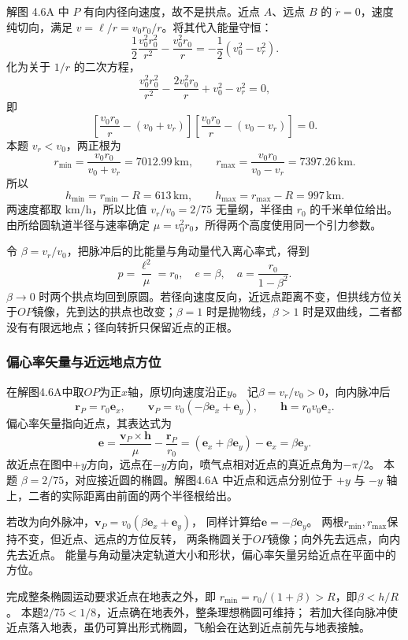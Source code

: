 \documentclass[UTF8,fontset=fandol,a4paper,11pt]{ctexart}
\newcommand{\vect}[1]{\bm{#1}}
\begin{document}
解图 4.6A 中 $P$ 有向内径向速度，故不是拱点。近点 $A$、远点 $B$ 的 $\dot r=0$，速度纯切向，满足 $v=\ell/r=v_0r_0/r$。将其代入能量守恒：
\[
\frac12\frac{v_0^2r_0^2}{r^2}-\frac{v_0^2r_0}{r}
=-\frac12(v_0^2-v_r^2).
\]
化为关于 $1/r$ 的二次方程，
\[
\frac{v_0^2r_0^2}{r^2}-\frac{2v_0^2r_0}r+v_0^2-v_r^2=0,
\]
即
\[
\left[\frac{v_0r_0}r-(v_0+v_r)\right]
\left[\frac{v_0r_0}r-(v_0-v_r)\right]=0.
\]
本题 $v_r<v_0$，两正根为
\[
r_{\min}=\frac{v_0r_0}{v_0+v_r}=7012.99\,\mathrm{km},\qquad
r_{\max}=\frac{v_0r_0}{v_0-v_r}=7397.26\,\mathrm{km}.
\]
所以
\[
\boxed{h_{\min}=r_{\min}-R=613\,\mathrm{km},\qquad
h_{\max}=r_{\max}-R=997\,\mathrm{km}}.
\]
两速度都取 $\mathrm{km/h}$，所以比值 $v_r/v_0=2/75$ 无量纲，半径由 $r_0$ 的千米单位给出。由所给圆轨道半径与速率确定 $\mu=v_0^2r_0$，所得两个高度使用同一个引力参数。

令 $\beta=v_r/v_0$，把脉冲后的比能量与角动量代入离心率式，得到
\[
p=\frac{\ell^2}\mu=r_0,\quad e=\beta,\quad
a=\frac{r_0}{1-\beta^2}.
\]
$\beta\to0$ 时两个拱点均回到原圆。若径向速度反向，近远点距离不变，但拱线方位关于$OP$镜像，先到达的拱点也改变；$\beta=1$ 时是抛物线，$\beta>1$ 时是双曲线，二者都没有有限远地点；径向转折只保留近点的正根。
\subsubsection*{偏心率矢量与近远地点方位}
在解图4.6A中取$OP$为正$x$轴，原切向速度沿正$y$。
记$\beta=v_r/v_0>0$，向内脉冲后
\[
\vect r_P=r_0\vect e_x,\qquad
\vect v_P=v_0(-\beta\vect e_x+\vect e_y),\qquad
\vect h=r_0v_0\vect e_z.
\]
偏心率矢量指向近点，其表达式为
\[
\vect e=\frac{\vect v_P\times\vect h}{\mu}
-\frac{\vect r_P}{r_0}
=(\vect e_x+\beta\vect e_y)-\vect e_x
=\beta\vect e_y.
\]
故近点在图中$+y$方向，远点在$-y$方向，喷气点相对近点的真近点角为$-\pi/2$。
本题 $\beta=2/75$，对应接近圆的椭圆。解图4.6A 中近点和远点分别位于 $+y$ 与 $-y$ 轴上，二者的实际距离由前面的两个半径根给出。

若改为向外脉冲，$\vect v_P=v_0(\beta\vect e_x+\vect e_y)$，
同样计算给$\vect e=-\beta\vect e_y$。
两根$r_{\min},r_{\max}$保持不变，但近点、远点的方位反转，
两条椭圆关于$OP$镜像；向外先去远点，向内先去近点。
能量与角动量决定轨道大小和形状，偏心率矢量另给近点在平面中的方位。

完成整条椭圆运动要求近点在地表之外，即
$r_{\min}=r_0/(1+\beta)>R$，即$\beta<h/R$。
本题$2/75<1/8$，近点确在地表外，整条理想椭圆可维持；
若加大径向脉冲使近点落入地表，虽仍可算出形式椭圆，飞船会在达到近点前先与地表接触。


\end{document}
